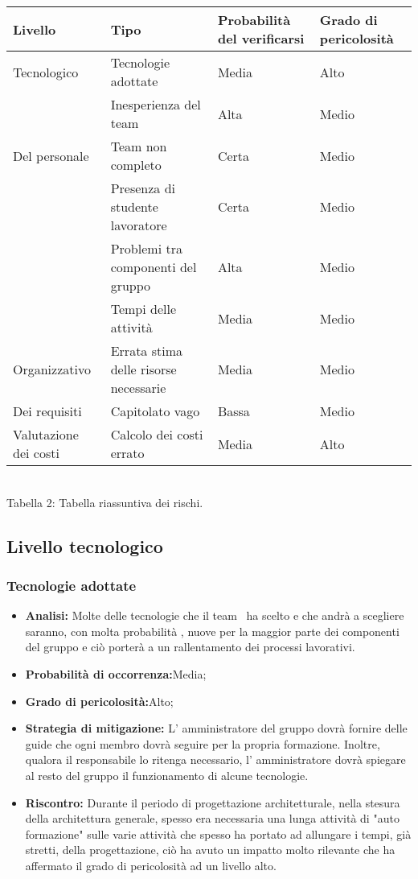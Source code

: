 \begin{center}
	\begin{tabular}{| >{\centering\arraybackslash}m{1in} | >{\centering\arraybackslash}m{1in} | >{\centering\arraybackslash}m{1in} | >{\centering\arraybackslash}m{1in} |}
		\hline
		\textbf{Livello} & \textbf{Tipo} & \textbf{Probabilità del verificarsi}& \textbf{Grado di pericolosità} \\
		\hline
		Tecnologico & Tecnologie adottate & Media & Alto\\
		\hline
		& Inesperienza del team & Alta & Medio \\		
		\cline{2-4}
		 Del personale   & Team non completo & Certa & Medio \\
		 \cline{2-4}
		& Presenza di studente lavoratore & Certa & Medio \\
		 \cline{2-4}
		 & Problemi tra componenti del gruppo & Alta & Medio \\
		 \hline
		 & Tempi delle attività & Media & Medio \\
		 \cline{2-4}
		Organizzativo  & Errata stima delle risorse necessarie & Media & Medio \\
		 \hline
		 Dei requisiti & Capitolato vago & Bassa & Medio \\
		 \hline
		 Valutazione dei costi & Calcolo dei costi errato & Media & Alto \\
		 \hline
	\end{tabular}
	\\
	Tabella 2: Tabella riassuntiva dei rischi.
\end{center}
\subsection{Livello tecnologico}
\subsubsection{Tecnologie adottate}
	\begin{itemize}
	\item \textbf{Analisi: }Molte delle tecnologie che il team \gruppo ~ha scelto e che andrà a scegliere saranno, con molta probabilità , nuove per la maggior parte dei componenti del gruppo e ciò porterà a un rallentamento dei processi lavorativi.
	\item \textbf{Probabilità di occorrenza:}Media;
	\item \textbf{Grado di pericolosità:}Alto;
	\item \textbf{Strategia di mitigazione: }L' amministratore del gruppo dovrà fornire delle guide che ogni membro dovrà seguire per la propria formazione. Inoltre, qualora il responsabile lo ritenga necessario, l' amministratore dovrà spiegare al resto del gruppo il funzionamento di alcune tecnologie.
	\item \textbf{Riscontro:} Durante il periodo di progettazione architetturale, nella stesura della architettura generale, spesso era necessaria una lunga attività di "auto formazione" sulle varie attività che spesso ha portato ad allungare i tempi, già stretti, della progettazione, ciò ha avuto un impatto molto rilevante che ha affermato il grado di pericolosità ad un livello alto.
	\end{itemize}
